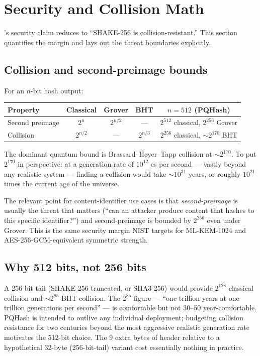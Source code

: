 \section{Security and Collision Math}
\label{sec:security}

\pqhash{}'s security claim reduces to ``SHAKE-256 is collision-resistant.'' This section quantifies the margin and lays out the threat boundaries explicitly.

\subsection{Collision and second-preimage bounds}

For an $n$-bit hash output:

\begin{center}
\small
\begin{tabular}{@{}lcccc@{}}
\toprule
\textbf{Property} & \textbf{Classical} & \textbf{Grover} \citep{grover1996} & \textbf{BHT} \citep{bht1998} & \textbf{$n=512$ (PQHash)} \\
\midrule
Second preimage  & $2^n$       & $2^{n/2}$ & ---       & $2^{512}$ classical, $2^{256}$ Grover \\
Collision        & $2^{n/2}$   & ---       & $2^{n/3}$ & $2^{256}$ classical, $\sim 2^{170}$ BHT \\
\bottomrule
\end{tabular}
\end{center}

The dominant quantum bound is Brassard--H{\o}yer--Tapp collision at $\sim 2^{170}$. To put $2^{170}$ in perspective: at a generation rate of $10^{12}$ \pqhash{}es per second --- vastly beyond any realistic system --- finding a collision would take $\sim 10^{31}$ years, or roughly $10^{21}$ times the current age of the universe.

The relevant point for content-identifier use cases is that \emph{second-preimage} is usually the threat that matters (``can an attacker produce content that hashes to this specific identifier?'') and second-preimage is bounded by $2^{256}$ even under Grover. This is the same security margin NIST targets for ML-KEM-1024 \citep{fips203} and AES-256-GCM-equivalent symmetric strength.

\subsection{Why 512 bits, not 256 bits}

A 256-bit tail (SHAKE-256 truncated, or SHA3-256) would provide $2^{128}$ classical collision and $\sim 2^{85}$ BHT collision. The $2^{85}$ figure --- ``one trillion years at one trillion generations per second'' --- is comfortable but not 30--50 year-comfortable. PQHash is intended to outlive any individual deployment; budgeting collision resistance for two centuries beyond the most aggressive realistic generation rate motivates the 512-bit choice. The 9 extra bytes of header relative to a hypothetical 32-byte (256-bit-tail) variant cost essentially nothing in practice.

